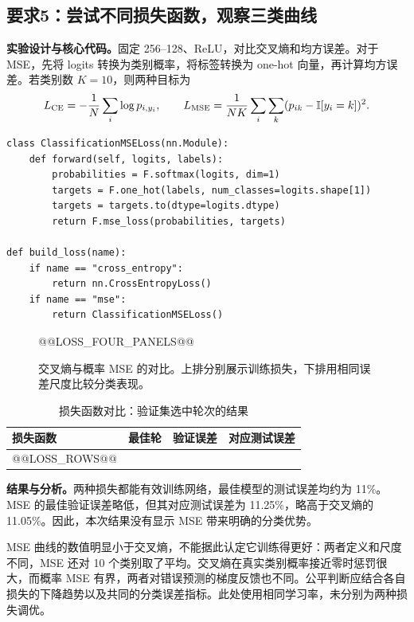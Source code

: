 \documentclass[UTF8,11pt,a4paper,fontset=fandol]{ctexart}
\newcommand{\question}[1]{\Needspace{14\baselineskip}\subsection{#1}}
\begin{document}
\question{要求5：尝试不同损失函数，观察三类曲线}
\textbf{实验设计与核心代码。}固定 256--128、ReLU，对比交叉熵和均方误差。对于 MSE，先将 logits 转换为类别概率，将标签转换为 one-hot 向量，再计算均方误差。若类别数 $K=10$，则两种目标为
\begin{equation}
L_{\rm CE}=-\frac{1}{N}\sum_i\log p_{i,y_i},\qquad
L_{\rm MSE}=\frac{1}{NK}\sum_i\sum_k(p_{ik}-\mathbb{I}[y_i=k])^2.
\end{equation}
\par\noindent\begin{minipage}{\linewidth}
\begin{lstlisting}
class ClassificationMSELoss(nn.Module):
    def forward(self, logits, labels):
        probabilities = F.softmax(logits, dim=1)
        targets = F.one_hot(labels, num_classes=logits.shape[1])
        targets = targets.to(dtype=logits.dtype)
        return F.mse_loss(probabilities, targets)

def build_loss(name):
    if name == "cross_entropy":
        return nn.CrossEntropyLoss()
    if name == "mse":
        return ClassificationMSELoss()
\end{lstlisting}
\end{minipage}\par
\begin{figure}[H]\centering
@@LOSS_FOUR_PANELS@@
\caption{交叉熵与概率 MSE 的对比。上排分别展示训练损失，下排用相同误差尺度比较分类表现。}\label{fig:loss}
\end{figure}
\begin{table}[H]\centering\small
\caption{损失函数对比：验证集选中轮次的结果}
\begin{tabular}{lrrr}\toprule
损失函数 & 最佳轮 & 验证误差 & 对应测试误差 \\\midrule
@@LOSS_ROWS@@
\bottomrule\end{tabular}
\end{table}
\textbf{结果与分析。}两种损失都能有效训练网络，最佳模型的测试误差均约为 11\%。MSE 的最佳验证误差略低，但其对应测试误差为 11.25\%，略高于交叉熵的 11.05\%。因此，本次结果没有显示 MSE 带来明确的分类优势。

MSE 曲线的数值明显小于交叉熵，不能据此认定它训练得更好：两者定义和尺度不同，MSE 还对 10 个类别取了平均。交叉熵在真实类别概率接近零时惩罚很大，而概率 MSE 有界，两者对错误预测的梯度反馈也不同。公平判断应结合各自损失的下降趋势以及共同的分类误差指标。此处使用相同学习率，未分别为两种损失调优。

\clearpage
\end{document}
